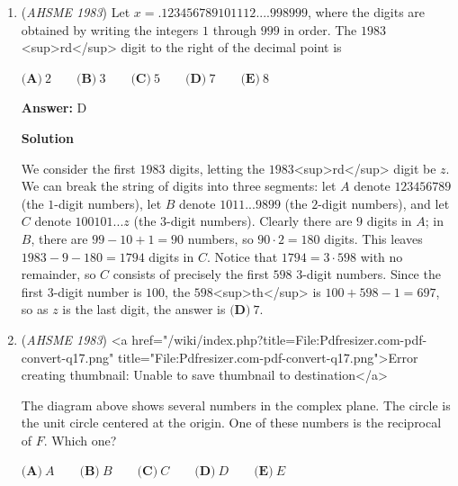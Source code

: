 \begin{enumerate}
 \textbf{Answer: }C



\textbf{Solution}

Since a ball is drawn three times and the sum is $6$, the only ways this can happen are the permutations of $1, 2, 3$ and $2, 2, 2$. Therefore, with there being $3! + 1 = 7$ equally-likely possibilities in total, the probability that the ball numbered $2$ was drawn all three times is $\boxed{\textbf{(C)}\ \frac{1}{7}}$.

 


	\item (\textit{AHSME 1983}) Let $x = .123456789101112....998999$, where the digits are obtained by writing the integers $1$ through $999$ in order. 
The $1983$<sup>rd</sup> digit to the right of the decimal point is


 $\textbf{(A)}\ 2\qquad \textbf{(B)}\ 3\qquad \textbf{(C)}\ 5\qquad \textbf{(D)}\ 7\qquad \textbf{(E)}\ 8$

 \textbf{Answer: }D



\textbf{Solution}

We consider the first $1983$ digits, letting the $1983$<sup>rd</sup> digit be $z$. We can break the string of digits into three segments: let $A$ denote $123456789$ (the $1$-digit numbers), let $B$ denote $1011...9899$ (the $2$-digit numbers), and let $C$ denote $100101...z$ (the $3$-digit numbers). Clearly there are $9$ digits in $A$; in $B$, there are $99-10+1 = 90$ numbers, so $90 \cdot 2 = 180$ digits. This leaves $1983 - 9 - 180 = 1794$ digits in $C$. Notice that $1794 = 3 \cdot 598$ with no remainder, so $C$ consists of precisely the first $598$ $3$-digit numbers. Since the first $3$-digit number is $100$, the $598$<sup>th</sup> is $100 + 598 - 1 = 697$, so as $z$ is the last digit, the answer is $\boxed{\textbf{(D)}\ 7}$.

 


	\item (\textit{AHSME 1983}) <a href="/wiki/index.php?title=File:Pdfresizer.com-pdf-convert-q17.png" title="File:Pdfresizer.com-pdf-convert-q17.png">Error creating thumbnail: Unable to save thumbnail to destination</a>


 The diagram above shows several numbers in the complex plane. The circle is the unit circle centered at the origin. 
One of these numbers is the reciprocal of $F$. Which one? 


 $\textbf{(A)} \ A \qquad  \textbf{(B)} \ B \qquad  \textbf{(C)} \ C \qquad  \textbf{(D)} \ D \qquad  \textbf{(E)} \ E$


\end{enumerate}
